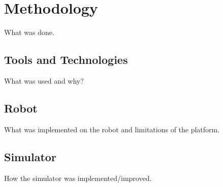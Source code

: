 \section{Methodology}
What was done.

\subsection{Tools and Technologies}
What was used and why?

\subsection{Robot}
What was implemented on the robot and limitations of the platform.

\subsection{Simulator}
How the simulator was implemented/improved.
